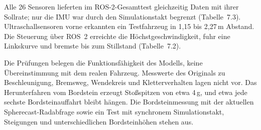 Alle 26 Sensoren lieferten im ROS-2-Gesamttest gleichzeitig Daten mit ihrer Sollrate;
nur die IMU war durch den Simulationstakt begrenzt (Tabelle~7.3). Ultraschallsensoren
vorne erkannten ein Testfahrzeug in 1,15 bis 2,27\,m Abstand. Die Steuerung über ROS~2
erreichte die Höchstgeschwindigkeit, fuhr eine Linkskurve und bremste bis zum
Stillstand (Tabelle~7.2).

Die Prüfungen belegen die Funktionsfähigkeit des Modells, keine Übereinstimmung mit dem
realen Fahrzeug. Messwerte des Originals zu Beschleunigung, Bremsweg, Wendekreis und
Kletterverhalten lagen nicht vor. Das Herunterfahren vom Bordstein erzeugt Stoßspitzen
von etwa 4\,g, und etwa jede sechste Bordsteinauffahrt bleibt hängen. Die Bordsteinmessung mit der aktuellen Spherecast-Radabfrage
sowie ein Test mit synchronem Simulationstakt, Steigungen und unterschiedlichen Bordsteinhöhen stehen aus.
